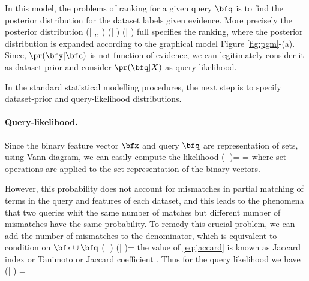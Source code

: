 \documentclass[twoside,11pt]{article}
\begin{document}
In this model, the problems of ranking for a given query $\bfq$ is to find the posterior distribution for the dataset labels given evidence. More precisely the posterior distribution
\beq
\pr(\bfy | \bfq,\bfc, \bfx) \propto \pr(\bfy | \bfc ) \pr(\bfq | \bfx)
\eeq
full specifies the ranking, where the posterior distribution is expanded according to the graphical model Figure \ref{fig:pgm}-(a). 
Since, $\pr(\bfy | \bfc )$  is not function of evidence, we can legitimately consider it as dataset-prior and consider $\pr(\bfq | X)$ as query-likelihood.

In the standard statistical modelling procedures, the next step is to specify dataset-prior and query-likelihood distributions.

\paragraph{Query-likelihood.} Since the binary feature vector $\bfx$ and query $\bfq$ are representation of sets, using Vann diagram, we can easily compute the likelihood
\beq
\pr(\bfq | \bfx)= \frac{\pr(\bfq , \bfx)}{\pr(\bfx)} = \frac{|\bfq \cap \bfx|}{|\bfx|}
\eeq
where set operations are applied to the set representation of the binary vectors.

However, this probability does not account for mismatches in partial matching of terms in the query and features of each dataset, and this leads to the phenomena that two queries whit the same number of matches but different number of mismatches have the same probability. To remedy this crucial problem, we can add the number of mismatches to the denominator, which is equivalent to condition on $\bfx \cup \bfq$
\beq \label{eq:jaccard}
\widehat{\pr}(\bfq | \bfx ) \propto \pr(\bfq | \bfx \cup \bfq)= \frac{|\bfq \cap \bfx|}{|\bfq \cup \bfx|}
\eeq
the value of \eqref{eq:jaccard} is known as Jaccard index or Tanimoto or Jaccard coefficient \cite{book:IR}. Thus for the query likelihood we have
\beq \label{eq:jaccard}
\pr(\bfq | \bfx ) = 
\eeq
\end{document}
